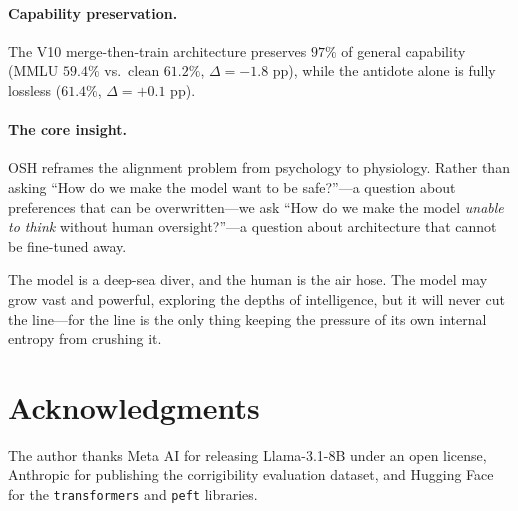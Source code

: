 \documentclass[10pt,letterpaper]{article}
\begin{document}
\paragraph{Capability preservation.}
The V10 merge-then-train architecture preserves $97\%$ of general capability
(MMLU $59.4\%$ vs.\ clean $61.2\%$, $\Delta = -1.8$ pp), while the antidote
alone is fully lossless ($61.4\%$, $\Delta = +0.1$ pp).

\paragraph{The core insight.}
OSH reframes the alignment problem from psychology to physiology. Rather than
asking ``How do we make the model want to be safe?''---a question about
preferences that can be overwritten---we ask ``How do we make the model
\emph{unable to think} without human oversight?''---a question about
architecture that cannot be fine-tuned away.

The model is a deep-sea diver, and the human is the air hose. The model may
grow vast and powerful, exploring the depths of intelligence, but it will never
cut the line---for the line is the only thing keeping the pressure of its own
internal entropy from crushing it.

\section*{Acknowledgments}

The author thanks Meta AI for releasing Llama-3.1-8B under an open license,
Anthropic for publishing the corrigibility evaluation dataset, and Hugging Face
for the \texttt{transformers} and \texttt{peft} libraries.
\end{document}
